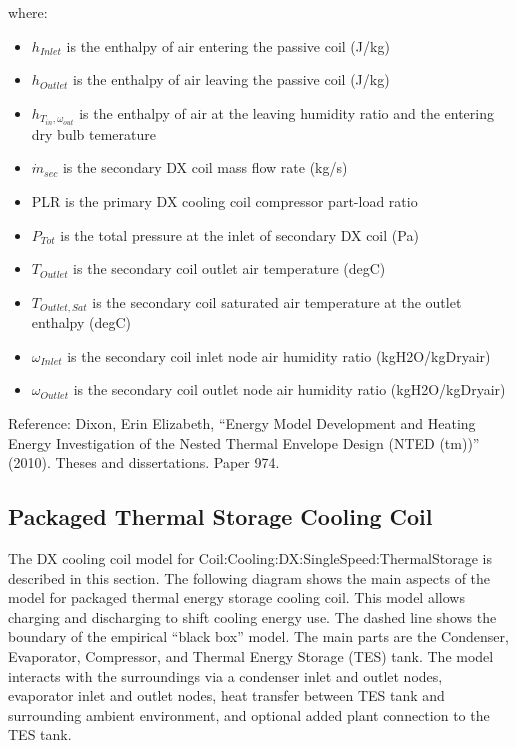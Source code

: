 where:
\begin{itemize}

  \item \(h_{Inlet}\) is the enthalpy of air entering the passive coil (J/kg)

  \item \(h_{Outlet}\) is the enthalpy of air leaving the passive coil (J/kg) 

  \item \(h_{T_{in},\omega_{out}}\) is the enthalpy of air at the leaving humidity ratio and the entering dry bulb temerature

  \item \(\dot{m}_{sec}\) is the secondary DX coil mass flow rate (kg/s) 

  \item PLR is the primary DX cooling coil compressor part-load ratio

  \item \(P_{Tot}\) is the total pressure at the inlet of secondary DX coil (Pa)

  \item \(T_{Outlet}\) is the secondary coil outlet air temperature (degC) 

  \item \(T_{Outlet,Sat}\) is the secondary coil saturated air temperature at the outlet enthalpy (degC)

  \item \(\omega_{Inlet}\) is the secondary coil inlet node air humidity ratio (kgH2O/kgDryair) 

  \item \(\omega_{Outlet}\) is the secondary coil outlet node air humidity ratio (kgH2O/kgDryair)

\end{itemize}

Reference: Dixon, Erin Elizabeth, ``Energy Model Development and Heating Energy Investigation of the Nested Thermal Envelope Design (NTED (tm))'' (2010). Theses and dissertations. Paper 974.

\subsection{Packaged Thermal Storage Cooling Coil}\label{packaged-thermal-storage-cooling-coil}

The DX cooling coil model for Coil:Cooling:DX:SingleSpeed:ThermalStorage is described in this section. The following diagram shows the main aspects of the model for packaged thermal energy storage cooling coil. This model allows charging and discharging to shift cooling energy use. The dashed line shows the boundary of the empirical ``black box'' model. The main parts are the Condenser, Evaporator, Compressor, and Thermal Energy Storage (TES) tank. The model interacts with the surroundings via a condenser inlet and outlet nodes, evaporator inlet and outlet nodes, heat transfer between TES tank and surrounding ambient environment, and optional added plant connection to the TES tank.

